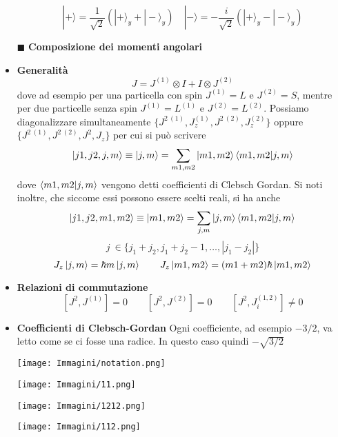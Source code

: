 \documentclass{book}
\newcommand{\g}{\textbf}
\newcommand{\e}{\begin{equation}}
\newcommand{\ex}{\end{equation} }
\renewcommand{\it}{\item[$\cdot$]}
\begin{document}
\begin{multicols}{4}
\begin{itemize}
    \e{|+\rangle = \frac{1}{\sqrt{2}}(|+\rangle_y + |-\rangle_y) \quad |-\rangle = -\frac{i}{\sqrt{2}}(|+\rangle_y - |-\rangle_y)} \ex
\item [$\blacksquare$] \g{Composizione dei momenti angolari}
    \it \g{Generalità}
        \e{J = J^{(1)} \otimes I + I \otimes J^{(2)}} \ex
        dove ad esempio per una particella con spin $J^{(1)} = L$ e $J^{(2)} = S$, mentre per due particelle senza spin $J^{(1)} = L^{(1)}$ e $J^{(2)} = L^{(2)}$. Possiamo diagonalizzare simultaneamente $\{J^{2 \ (1)}, J^{(1)}_z,J^{2 \ (2)}, J^{(2)}_z\}$ oppure $\{J^{2 \ (1)}, J^{2 \ (2)}, J^{2},J_{z}\}$ per cui si può scrivere
        \e{\ket{j1,j2,j,m} \equiv \ket{j,m} = \sum_{m1,m2}\ket{m1,m2}\braket{m1,m2}{j,m}}\ex
        dove $\braket{m1,m2}{j,m}$ vengono detti coefficienti di Clebsch Gordan. Si noti inoltre, che siccome essi possono essere scelti reali, si ha anche 
        \e{\ket{j1,j2,m1,m2} \equiv \ket{m1,m2} = \sum_{j,m} \ket{j,m}\braket{m1,m2}{j,m}}\ex 
         \e{j \ \in \{j_{1} + j_{2}, j_{1} + j_{2} - 1, \dots, |j_{1}-j_{2}|\}}\ex
        \e{J_{z}\ket{j,m} = \hbar m\ket{j,m} \qquad J_{z}\ket{m1,m2} = (m1 + m2)\hbar \ket{m1,m2}}\ex
    \it \g{Relazioni di commutazione}
        \e{[J^2, J^{(1)}] = 0 \qquad [J^2, J^{(2)}] = 0 \qquad [J^2, J^{(1,2)}_i] \neq 0} \ex
        \it \g{Coefficienti di Clebsch-Gordan} Ogni coefficiente, ad esempio $-3/2$, va letto come se ci fosse una radice. In questo caso quindi $-\sqrt{3/2}$
         \begin{minipage}[t]{1.1\linewidth}
        \centering
        \begin{minipage}[t]{0.3\linewidth} %
            \centering
            \texttt{[image: Immagini/notation.png]}
        \end{minipage}%
        \hfill
        \begin{minipage}[t]{0.7\linewidth} %
            \centering
            \texttt{[image: Immagini/11.png]}
        \end{minipage}
    \end{minipage}
 
    \begin{minipage}[t]{1.05\linewidth}
        \centering
        \begin{minipage}[t]{0.42\linewidth} %
            \centering
            \texttt{[image: Immagini/1212.png]}
        \end{minipage}%
        \begin{minipage}[t]{0.62\linewidth} %
            \centering
            \texttt{[image: Immagini/112.png]}
        \end{minipage}
    \end{minipage}
    

\end{itemize}
\end{multicols}
\end{document}
